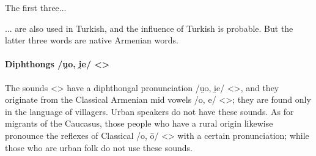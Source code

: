 \begin{table}[H]
	\centering
	\caption{Presence of the vowel /æ/ < > in the Karin dialect}
	\label{tab:Karin:phono:segment:vowel:ae}
\end{table}


The first three... 




\begin{adjarianpage}\label{page:105}\end{adjarianpage}%


... are also used in Turkish, and the influence of Turkish is probable. But the latter three words are native Armenian words.

\paragraph{Diphthongs /u̯o, i̯e/ <>}\label{karin:phono:segment:vowel:diph}

The sounds <> have a diphthongal pronunciation /u̯o, i̯e/ <>, and they originate from the Classical Armenian mid vowels /o, e/ <>; they are found only in the language of villagers. Urban speakers do not have these sounds. As for migrants of the Caucasus, those people who have a rural origin likewise pronounce the reflexes of Classical /o, ō/ <> with a certain pronunciation; while those who are urban folk do not use these sounds. 

